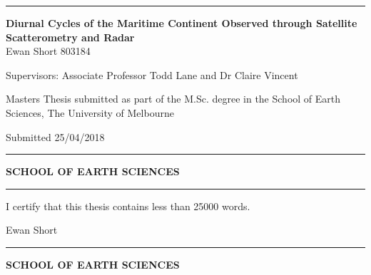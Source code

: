 \documentclass[12pt]{book}
\begin{document}


\begin{titlepage}
\begin{flushleft}
\hrule
\vspace{1 cm}
{\huge{\bf Diurnal Cycles of the Maritime Continent Observed through Satellite Scatterometry and Radar \\[15pt] }}
\vspace*{2cm}
\vspace{1 cm}
{\large Ewan Short 803184}
\vspace{0.5 cm}

{\large Supervisors: Associate Professor Todd Lane and Dr Claire Vincent}

\vspace{0.5 cm}
\vspace{2.5 cm}

{\large Masters Thesis submitted as part of the M.Sc. degree in the School of Earth Sciences, The University of Melbourne}

\vspace{0.5cm}
{\large Submitted 25/04/2018}
\vspace{5.25 cm}
\hrule
\end{flushleft}
\begin{flushleft}
\textbf{\textsf{SCHOOL OF EARTH SCIENCES}}
\end{flushleft}
\begin{flushright}
\end{flushright}
\end{titlepage}


\begin{titlepage}
\hrule
\vspace{9cm}
{\large I certify that this thesis contains less than 25000 words.}

\vspace{2.5cm}

{\large Ewan Short} 
\vspace{9cm}
\hrule
\begin{flushleft}
\textbf{\textsf{SCHOOL OF EARTH SCIENCES}}
\end{flushleft}
\begin{flushright}
\end{flushright}
\end{titlepage}

\setcounter{tocdepth}{2}
\end{document}
